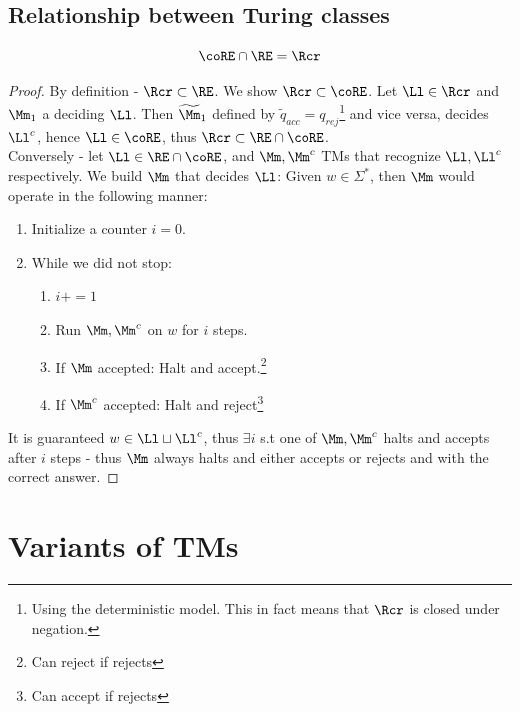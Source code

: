 \subsection{Relationship between Turing classes}
\begin{blueBox}
	\begin{thm}
		\[
		\coRE \cap \RE = \Rcr
		\]
	\end{thm}
\end{blueBox}
\begin{proof}
	By definition - $\Rcr \subset \RE$. We show $\Rcr \subset \coRE$. Let $\Ll\in \Rcr$ and $\Mm_1$ a \TM deciding $\Ll$. Then $\widetilde{\Mm}_1$ defined by $\widetilde{q}_{acc} = q_{rej}$\footnote{Using the deterministic model. This in fact means that $\Rcr$ is closed under negation.} and vice versa, decides $\Ll^c$, hence $\Ll\in \coRE$, thus $\Rcr\subset \RE \cap \coRE$.\\
	Conversely - let $\Ll\in \RE\cap \coRE$, and $\Mm, \Mm^c$ TMs that recognize $\Ll,\Ll^c$ respectively. We build $\Mm$ that decides $\Ll$: Given $w\in \Sigma^*$, then $\Mm$ would operate in the following manner: 
	\begin{enumerate}
		\item Initialize a counter $i=0$.
		\item While we did not stop:\begin{enumerate}[2.1]
			\item $i += 1$
			\item Run $\Mm, \Mm^c$ on $w$ for $i$ steps. 
			\item If $\Mm$ accepted: Halt and accept.\footnote{Can reject if rejects}
			\item If $\Mm^c$ accepted: Halt and reject\footnote{Can accept if rejects}
		\end{enumerate}
	\end{enumerate}
	It is guaranteed $w\in \Ll \sqcup \Ll^c$, thus $\exists i$ s.t one of $\Mm, \Mm^c$ halts and accepts after $i$ steps - thus $\Mm$ always halts and either accepts or rejects and with the correct answer.
\end{proof}
\section{Variants of TMs}
